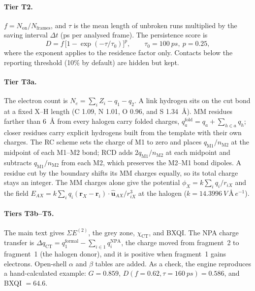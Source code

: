 \documentclass[journal=jcisd8,manuscript=suppinfo]{achemso}
\newcommand{\ET}{E^{(2)}}
\begin{document}
\begin{singlespace}
\paragraph{Tier T2.} $f=N_\mathrm{on}/N_\mathrm{frames}$, and $\tau$ is the mean length of unbroken runs multiplied by the saving interval $\Delta t$ (ps per analysed frame). The persistence score is
\begin{equation}
D=f\,\bigl[1-\exp(-\tau/\tau_0)\bigr]^{p},\qquad \tau_0 = \SI{100}{ps},\ p = 0.25,
\end{equation}
where the exponent applies to the residence factor only. Contacts below the reporting threshold (10\% by default) are hidden but kept.

\paragraph{Tier T3a.} The electron count is $N_e=\sum_i Z_i-q_1-q_2$. A link hydrogen sits on the cut bond at a fixed X--H length (C 1.09, N 1.01, O 0.96, and S \SI{1.34}{\angstrom}). MM residues farther than \SI{6}{\angstrom} from every halogen carry folded charges, $q_a^\mathrm{fold}=q_a+\sum_{h\in a}q_h$; closer residues carry explicit hydrogens built from the template with their own charges. The RC scheme\cite{LinTruhlar2005} sets the charge of M1 to zero and places $q_\mathrm{M1}/n_\mathrm{M2}$ at the midpoint of each M1--M2 bond; RCD adds $2q_\mathrm{M1}/n_\mathrm{M2}$ at each midpoint and subtracts $q_\mathrm{M1}/n_\mathrm{M2}$ from each M2, which preserves the M2--M1 bond dipoles. A residue cut by the boundary shifts its MM charges equally, so its total charge stays an integer. The MM charges alone give the potential $\phi_X=k\sum_i q_i/r_{iX}$ and the field $E_{AX}=k\sum_i q_i(\mathbf r_X-\mathbf r_i)\cdot\hat{\mathbf u}_{AX}/r_{iX}^3$ at the halogen ($k=\SI{14.3996}{V\,\angstrom\,e^{-1}}$).

\paragraph{Tiers T3b--T5.} The main text gives $\Sigma\ET$, the grey zone, $\chi_\mathrm{CT}$, and BXQI. The NPA charge transfer is $\Delta q_\mathrm{CT}=q_1^\mathrm{formal}-\sum_{i\in1}q_i^\mathrm{NPA}$, the charge moved from fragment~2 to fragment~1 (the halogen donor), and it is positive when fragment~1 gains electrons. Open-shell $\alpha$ and $\beta$ tables are added. As a check, the engine reproduces a hand-calculated example: $G=0.859$, $D(f = 0.62, \tau = \SI{160}{ps}) = 0.586$, and BXQI $=64.6$.


\end{singlespace}
\end{document}
